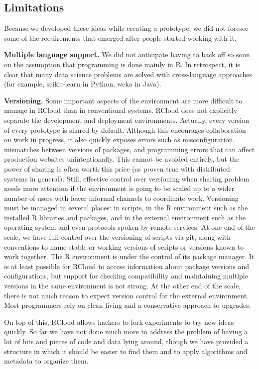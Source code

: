 \subsection{Limitations}

Because we developed these ideas while creating a prototype,
we did not foresee some of the requirements that emerged after
people started working with it.

{\bf Multiple language support.}
We did not anticipate having to back off so soon on the assumption that
programming is done mainly in R.  In retrospect, it is clear that many
data science problems are solved with cross-language approaches
(for example, scikit-learn in Python, weka in Java).

{\bf Versioning.}
Some important aspects of the environment are more difficult to manage
in RCloud than in conventional systems.  RCloud does not explicitly
separate the development and deployment environments. Actually, every
version of every prototype is shared by default. Although this encourages
collaboration on work in progress, it also quickly exposes errors such as
misconfiguration, mismatches between versions of packages, and programming
errors that can affect production websites unintentionally.
This cannot be avoided entirely, but the power of sharing is often worth
this price (as proven true with distributed systems in general).
Still, effective control over versioning when sharing 
problem needs more attention if the environment is
going to be scaled up to a wider number of users with fewer
informal channels to coordinate work.
Versioning must be managed in several places: in scripts, in the R environment
such as the installed R libraries and packages, and in the external
environment such as the operating system and even protocols spoken by
remote services. At one end of the scale, we have full control over the
versioning of scripts via git, along with conventions to name stable or
working versions of scripts or versions known to work together.
The R environment is under the control of its package manager.
It is at least possible for RCloud to access information about
package versions and configurations, but support for checking compatibility
and maintaining multiple versions in the same environment is not strong.
At the other end of the scale, there is not much reason to expect version
control for the external environment. Most programmers rely on clean living
and a conservative approach to upgrades.

On top of this, RCloud allows hackers to fork experiments to try
new ideas quickly. So far we have not done much more to address the
problem of having a lot of bits and pieces of code and data lying
around, though we have provided a structure in which it should be
easier to find them and to apply algorithms and metadata to organize them.

